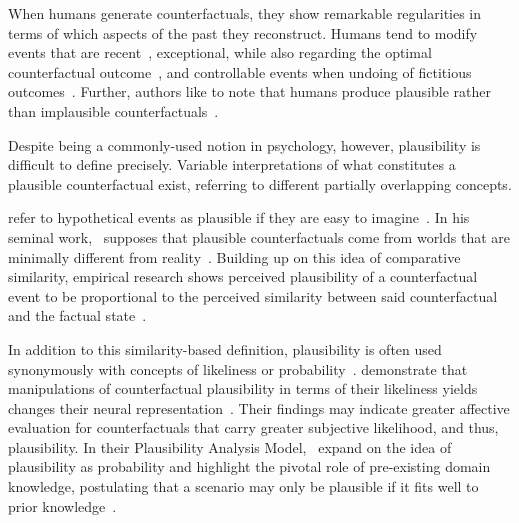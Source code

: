 When humans generate counterfactuals, they show remarkable regularities in terms of which aspects of the past they reconstruct. 
Humans tend to modify events that are recent~\citep{miller_temporal_1990, byrne_temporality_2000}, exceptional, while also regarding the optimal counterfactual outcome~\citep{kahneman_simulation_1982, dixon_if_2011}, and 
controllable events when undoing of fictitious outcomes~\citep{girotto_event_1991}.
Further, authors like to note that humans produce plausible rather than implausible counterfactuals~\citep{byrne_counterfactual_2016, de_brigard_coming_2013}.

Despite being a commonly-used notion in psychology, however, plausibility is difficult to define precisely.
Variable interpretations of what constitutes a plausible counterfactual exist, referring to different partially overlapping concepts.

\citeauthor{kahneman_simulation_1982} refer to hypothetical events as plausible if they are easy to imagine~\citep{kahneman_simulation_1982}. 
In his seminal work,~\citeauthor{lewis_counterfactuals_1973} supposes that plausible counterfactuals come from worlds that are minimally different from reality~\citep{lewis_counterfactuals_1973}. 
Building up on this idea of comparative similarity, empirical research shows perceived plausibility of a counterfactual event to be proportional to the perceived similarity between said counterfactual and the factual state~\citep{stanley_counterfactual_2017, de_brigard_perceived_2021}.

In addition to this similarity-based definition, plausibility is often used synonymously with concepts of likeliness or probability~\citep{pezdek_is_2006, de_brigard_remembering_2013}. 
\citeauthor{de_brigard_remembering_2013} demonstrate that manipulations of counterfactual plausibility in terms of their likeliness yields changes their neural representation~\citep{de_brigard_remembering_2013}.
Their findings may indicate greater affective evaluation for counterfactuals that carry greater subjective likelihood, and thus, plausibility.
In their Plausibility Analysis Model,~\citeauthor{connell_model_2006} expand on the idea of plausibility as probability and highlight the pivotal role of pre-existing domain knowledge, postulating that a scenario may only be plausible if it fits well to prior knowledge~\citep{connell_model_2006}.

